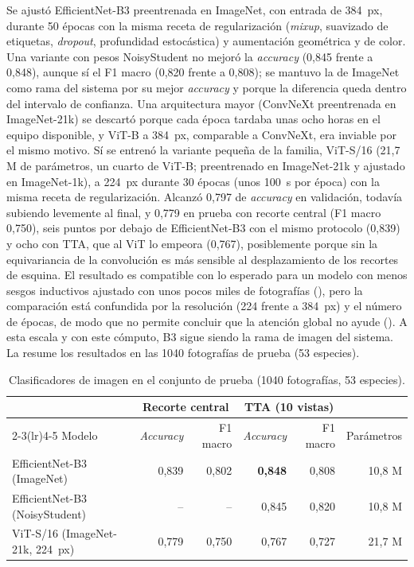Se ajustó EfficientNet-B3 preentrenada en ImageNet, con entrada de
\SI{384}{px}, durante 50 épocas con la misma receta de regularización
(\textit{mixup}, suavizado de etiquetas, \textit{dropout}, profundidad
estocástica) y aumentación geométrica y de color. Una variante con pesos
NoisyStudent no mejoró la \textit{accuracy} (0,845 frente a 0,848), aunque sí
el F1 macro (0,820 frente a 0,808); se mantuvo la de ImageNet como rama del
sistema por su mejor \textit{accuracy} y porque la diferencia queda dentro del
intervalo de confianza. Una arquitectura mayor
(ConvNeXt preentrenada en ImageNet-21k) se descartó porque cada época tardaba
unas ocho horas en el equipo disponible, y ViT-B a \SI{384}{px}, comparable
a ConvNeXt, era inviable por el mismo motivo. Sí se entrenó la variante
pequeña de la familia, ViT-S/16 (21,7 M de parámetros, un cuarto de ViT-B;
preentrenado en ImageNet-21k y ajustado en ImageNet-1k), a \SI{224}{px}
durante 30 épocas (unos \SI{100}{\second} por época) con la misma receta de
regularización. Alcanzó 0,797 de \textit{accuracy} en validación, todavía
subiendo levemente al final, y 0,779 en prueba con recorte central (F1 macro
0,750), seis puntos por debajo de EfficientNet-B3 con el mismo protocolo
(0,839) y ocho con TTA, que al ViT lo empeora (0,767), posiblemente porque
sin la equivariancia de la convolución es más sensible al desplazamiento de
los recortes de esquina. El resultado es compatible con lo esperado para un
modelo con menos sesgos inductivos ajustado con unos pocos miles de
fotografías (), pero la comparación está
confundida por la resolución (224 frente a \SI{384}{px}) y el número de
épocas, de modo que no permite concluir que la atención global no ayude
(). A esta escala y con este cómputo, B3 sigue
siendo la rama de imagen del sistema. La  resume los
resultados en las \num{1040} fotografías de prueba (53 especies).

\begin{table}[!htb]
  \centering\small
  \caption{Clasificadores de imagen en el conjunto de prueba (\num{1040}
  fotografías, 53 especies).}
  \label{tab:imagen}
  \begin{tabular}{@{}l r r r r r@{}}
    \toprule
    & \multicolumn{2}{c}{Recorte central} & \multicolumn{2}{c}{TTA (10 vistas)} & \\
    \cmidrule(lr){2-3}\cmidrule(lr){4-5}
    Modelo & \textit{Accuracy} & F1 macro & \textit{Accuracy} & F1 macro & Parámetros \\
    \midrule
    EfficientNet-B3 (ImageNet) & 0,839 & 0,802 & \textbf{0,848} & 0,808 & 10,8 M \\
    EfficientNet-B3 (NoisyStudent) & -- & -- & 0,845 & 0,820 & 10,8 M \\
    ViT-S/16 (ImageNet-21k, \SI{224}{px}) & 0,779 & 0,750 & 0,767 & 0,727 & 21,7 M \\
    \bottomrule
  \end{tabular}
\end{table}

